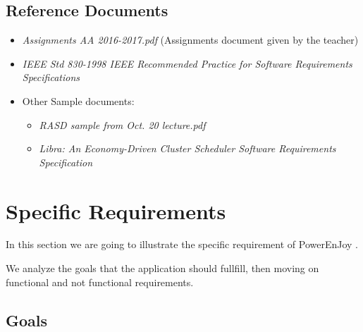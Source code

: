 \documentclass[11pt]{article} %
\newcommand{\pe}{PowerEnJoy }
\begin{document}
\subsection{Reference Documents}
\begin{itemize}
	\item \textit{Assignments AA 2016-2017.pdf} (Assignments document given by the teacher)
	\item \textit{IEEE Std 830-1998 IEEE Recommended Practice for Software Requirements Specifications}
	\item Other Sample documents:
		\begin{itemize}
			\item \textit{RASD sample from Oct. 20 lecture.pdf}
			\item \textit{Libra: An Economy-Driven Cluster Scheduler Software Requirements Specification}
		\end{itemize}
  \end{itemize}

\newpage

\section{Specific Requirements}

In this section we are going to illustrate the specific requirement of \pe.

We analyze the goals that the application should fullfill, then moving on functional and not functional requirements.

 \subsection{Goals}
\end{document}
